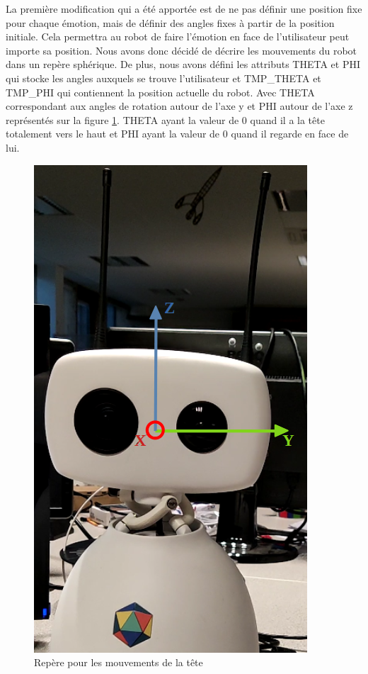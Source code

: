 \documentclass[a4paper,french]{article}
\begin{document}
La première modification qui a été apportée est de ne pas définir une position fixe pour chaque émotion, mais de définir des angles fixes à partir de la position initiale. Cela permettra au robot de faire l'émotion en face de l'utilisateur peut importe sa position. Nous avons donc décidé de décrire les mouvements du robot dans un repère sphérique. De plus, nous avons défini les attributs \textcolor{freeblue}{THETA} et \textcolor{freeblue}{PHI} qui stocke les angles auxquels se trouve l'utilisateur et \textcolor{freeblue}{TMP\_THETA} et \textcolor{freeblue}{TMP\_PHI} qui contiennent la position actuelle du robot. Avec THETA correspondant aux angles de rotation autour de l'axe y et PHI autour de l'axe z représentés sur la figure \ref{fig:repere}. THETA ayant la valeur de 0 quand il a la tête totalement vers le haut et PHI ayant la valeur de 0 quand il regarde en face de lui.

\begin{figure}[H]
    \centering
    \includegraphics[scale = 0.25]{figures/repere.png}
    \caption{Repère pour les mouvements de la tête}
    \label{fig:repere}
\end{figure}
\end{document}
